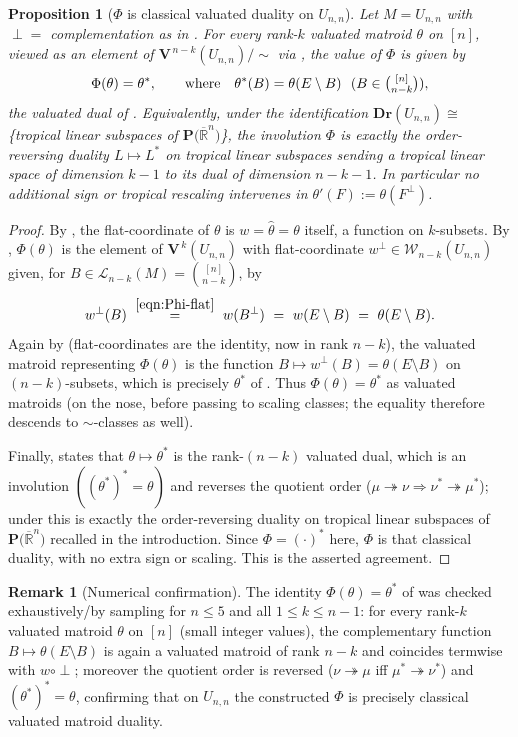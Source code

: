 \documentclass{article}
\newtheorem{proposition}[theorem]{Proposition}
\theoremstyle{definition}
\newtheorem{remark}[theorem]{Remark}
\newcommand{\Rbar}{\overline{\mathbb{R}}}
\newcommand{\onto}{\twoheadrightarrow}
\newcommand{\Dr}{\mathbf{Dr}}
\newcommand{\bV}{\mathbf V}
\newcommand{\cLL}{\mathcal{L}}
\newcommand{\cW}{\mathcal{W}}
\newcommand{\PT}[1]{\mathbf{P}\big(\Rbar^{#1}\big)}
\begin{document}
\begin{proposition}[$\Phi$ is classical valuated duality on $U_{n,n}$]\label{prop:Unn-agree}
Let $M=U_{n,n}$ with $\perp=$ complementation as in . For every rank-$k$ valuated
matroid $\theta$ on $[n]$, viewed as an element of $\bV^{\,n-k}(U_{n,n})/\!\sim$ via
, the value of $\Phi$ is given by
\[
  \Phi(\theta)=\theta^{*},\qquad\text{where}\quad \theta^{*}(B)=\theta(E\setminus B)\ \ (B\in\tbinom{[n]}{n-k}),
\]
the valuated dual of . Equivalently, under the identification $\Dr(U_{n,n})\cong$
\{tropical linear subspaces of $\PT{n}$\}, the involution $\Phi$ is exactly the order-reversing
duality $L\mapsto L^{*}$ on tropical linear subspaces sending a tropical linear space of dimension
$k-1$ to its dual of dimension $n-k-1$. In particular no additional sign or tropical rescaling
intervenes in $\theta'(F):=\theta(F^{\perp})$.
\end{proposition}

\begin{proof}
By , the flat-coordinate of $\theta$ is $w=\widehat\theta=\theta$ itself, a
function on $k$-subsets. By , $\Phi(\theta)$ is the element of $\bV^{\,k}(U_{n,n})$ with
flat-coordinate $w^{\perp}\in\cW_{n-k}(U_{n,n})$ given, for $B\in\cLL_{n-k}(M)=\binom{[n]}{n-k}$, by
\[
  w^{\perp}(B)\ \overset{\eqref{eqn:Phi-flat}}{=}\ w(B^{\perp})\ =\ w(E\setminus B)\ =\ \theta(E\setminus B).
\]
Again by  (flat-coordinates are the identity, now in rank $n-k$), the valuated
matroid representing $\Phi(\theta)$ is the function $B\mapsto w^{\perp}(B)=\theta(E\setminus B)$ on
$(n-k)$-subsets, which is precisely $\theta^{*}$ of . Thus $\Phi(\theta)=\theta^{*}$
as valuated matroids (on the nose, before passing to scaling classes; the equality therefore descends
to $\sim$-classes as well).

Finally,  states that $\theta\mapsto\theta^{*}$ is the rank-$(n-k)$ valuated dual,
which is an involution $((\theta^{*})^{*}=\theta)$ and reverses the quotient order
($\mu\onto\nu\Rightarrow\nu^{*}\onto\mu^{*}$); under  this is exactly the
order-reversing duality on tropical linear subspaces of $\PT{n}$ recalled in the introduction. Since
$\Phi=(\cdot)^{*}$ here, $\Phi$ is that classical duality, with no extra sign or scaling. This is the
asserted agreement.
\end{proof}

\begin{remark}[Numerical confirmation]\label{rmk:Unn-numeric}
The identity $\Phi(\theta)=\theta^{*}$ of  was checked exhaustively/by sampling
for $n\le 5$ and all $1\le k\le n-1$: for every rank-$k$ valuated matroid $\theta$ on $[n]$ (small
integer values), the complementary function $B\mapsto\theta(E\setminus B)$ is again a valuated matroid
of rank $n-k$ and coincides termwise with $w\circ\perp$; moreover the quotient order is reversed
($\nu\onto\mu$ iff $\mu^{*}\onto\nu^{*}$) and $(\theta^{*})^{*}=\theta$, confirming that on
$U_{n,n}$ the constructed $\Phi$ is precisely classical valuated matroid duality.
\end{remark}
\end{document}
